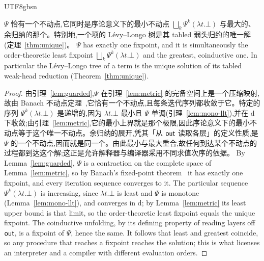 \begin{CJK*}{UTF8}{gbsn}
  \begin{theorem}\label{thm:unique-coalgebra}
    \ifTablambdaChinese
    $\Psi$ 恰有一个不动点,它同时是序论意义下的最小不动点 $\bigsqcup_k \Psi^k(\lambda t.\bot)$ 与最大的、余归纳的那个。特别地,一个项的 Lévy--Longo 树是其 tabled 弱头归约的唯一解(定理~\ref{thm:unique})。
    \else
    $\Psi$ has exactly one fixpoint, and it is simultaneously the order-theoretic least fixpoint $\bigsqcup_k \Psi^k(\lambda t.\bot)$ and the greatest, coinductive one. In particular the L\'evy--Longo tree of a term is the unique solution of its tabled weak-head reduction (Theorem~\ref{thm:unique}).
    \fi
  \end{theorem}
  \begin{proof}
    \ifTablambdaChinese
    由引理~\ref{lem:guarded},$\Psi$ 在引理~\ref{lem:metric} 的完备空间上是一个压缩映射,故由 Banach 不动点定理~\cite{banach1922-operations},它恰有一个不动点,且每条迭代序列都收敛于它。特定的序列 $\Psi^k(\lambda t.\bot)$ 是递增的,因为 $\lambda t.\bot$ 最小且 $\Psi$ 单调(引理~\ref{lem:mono-llt}),并在 $\mathrm{d}$ 下收敛;由引理~\ref{lem:metric},它的最小上界就是那个极限,因此序论意义下的最小不动点等于这个唯一不动点。余归纳的展开,凭其「从 $\mathsf{out}$ 读取各层」的定义性质,是 $\Psi$ 的一个不动点,因而就是同一个。由此最小与最大重合,故任何到达某个不动点的过程都到达这个解;这正是允许解释器与编译器采用不同求值次序的依据。
    \else
    By Lemma~\ref{lem:guarded}, $\Psi$ is a contraction on the complete space of Lemma~\ref{lem:metric}, so by Banach's fixed-point theorem~\cite{banach1922-operations} it has exactly one fixpoint, and every iteration sequence converges to it. The particular sequence $\Psi^k(\lambda t.\bot)$ is increasing, since $\lambda t.\bot$ is least and $\Psi$ is monotone (Lemma~\ref{lem:mono-llt}), and converges in $\mathrm{d}$; by Lemma~\ref{lem:metric} its least upper bound is that limit, so the order-theoretic least fixpoint equals the unique fixpoint. The coinductive unfolding, by its defining property of reading layers off $\mathsf{out}$, is a fixpoint of $\Psi$, hence the same. It follows that least and greatest coincide, so any procedure that reaches a fixpoint reaches the solution; this is what licenses an interpreter and a compiler with different evaluation orders.
    \fi
  \end{proof}

  \subsection{}\label{sec:tabling}


\end{CJK*}
